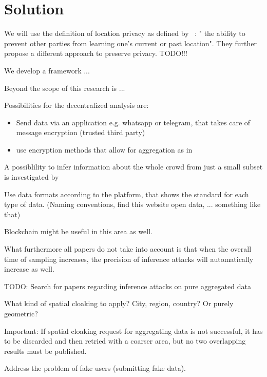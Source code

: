 \chapter{Solution}\label{chapter:solution}


We will use the definition of location privacy as defined by ~\parencite{location-privacy}: " the ability to prevent other parties from learning
one’s current or past location". They further propose a different approach to preserve privacy. TODO!!!


We develop a framework ... 

Beyond the scope of this research is ...

Possibilities for the decentralized analysis are:
\begin{itemize}
	\item Send data via an application e.g. whatsapp or telegram, that takes care of message encryption (trusted third party)
	\item use encryption methods that allow for aggregation as in \parencite{crowdsourcing}
\end{itemize}

A possiblility to infer information about the whole crowd from just a small subset is investigated by \parencite{subset}

Use data formats according to the platform, that shows the standard for each type of data. (Naming conventions, find this website open data, ... something like that)

Blockchain might be useful in this area as well.

What furthermore all papers do not take into account is that when the overall time of sampling increases, the precision of inference attacks will automatically increase as well. 

TODO: Search for papers regarding inference attacks on pure aggregated data

What kind of spatial cloaking to apply? City, region, country? Or purely geometric?

Important: If spatial cloaking request for aggregating data is not successful, it has to be discarded and then retried with a coarser area, but no two overlapping results must be published.

Address the problem of fake users (submitting fake data).


